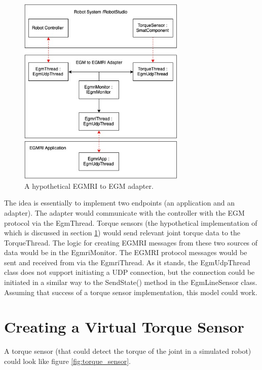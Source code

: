 \documentclass{cslthse-msc}
\begin{document}
\begin{appendices}
\begin{figure}[H]
    \centering
    \includegraphics[width=8cm]{egmri.jpg}
    \caption{A hypothetical EGMRI to EGM adapter.}
    \label{fig:egmri_adapter}
\end{figure}
The idea is essentially to implement two endpoints (an application and an adapter). The adapter would communicate with the controller with the EGM protocol via the EgmThread. Torque sensors (the hypothetical implementation of which is discussed in section \ref{app:Hypothetical:torque}) would send relevant joint torque data to the TorqueThread. The logic for creating EGMRI messages from these two sources of data would be in the EgmriMonitor. The EGMRI protocol messages would be sent and received from via the EgmriThread. As it stands, the EgmUdpThread class does not support initiating a UDP connection, but the connection could be initiated in a similar way to the SendState() method in the EgmLineSensor class. Assuming that success of a torque sensor implementation, this model could work.

\newpage
\section{Creating a Virtual Torque Sensor}
\label{app:Hypothetical:torque}
A torque sensor (that could detect the torque of the joint in a simulated robot) could look like figure \ref{fig:torque_sensor}.


\end{appendices}
\end{document}
